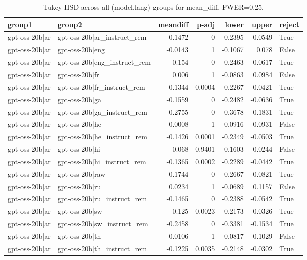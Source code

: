 \begin{table}
\caption{Tukey HSD across all (model,lang) groups for mean_diff, FWER=0.25.}
\label{tab:tukey_all_models_all_langs_mean_diff}
\begin{tabular}{l l r r r r l}
\toprule
group1 & group2 & meandiff & p-adj & lower & upper & reject \\
\midrule
gpt-oss-20b|ar & gpt-oss-20b|ar_instruct_rem & -0.1472 & 0 & -0.2395 & -0.0549 & True \\
gpt-oss-20b|ar & gpt-oss-20b|eng & -0.0143 & 1 & -0.1067 & 0.078 & False \\
gpt-oss-20b|ar & gpt-oss-20b|eng_instruct_rem & -0.154 & 0 & -0.2463 & -0.0617 & True \\
gpt-oss-20b|ar & gpt-oss-20b|fr & 0.006 & 1 & -0.0863 & 0.0984 & False \\
gpt-oss-20b|ar & gpt-oss-20b|fr_instruct_rem & -0.1344 & 0.0004 & -0.2267 & -0.0421 & True \\
gpt-oss-20b|ar & gpt-oss-20b|ga & -0.1559 & 0 & -0.2482 & -0.0636 & True \\
gpt-oss-20b|ar & gpt-oss-20b|ga_instruct_rem & -0.2755 & 0 & -0.3678 & -0.1831 & True \\
gpt-oss-20b|ar & gpt-oss-20b|he & 0.0008 & 1 & -0.0916 & 0.0931 & False \\
gpt-oss-20b|ar & gpt-oss-20b|he_instruct_rem & -0.1426 & 0.0001 & -0.2349 & -0.0503 & True \\
gpt-oss-20b|ar & gpt-oss-20b|hi & -0.068 & 0.9401 & -0.1603 & 0.0244 & False \\
gpt-oss-20b|ar & gpt-oss-20b|hi_instruct_rem & -0.1365 & 0.0002 & -0.2289 & -0.0442 & True \\
gpt-oss-20b|ar & gpt-oss-20b|raw & -0.1744 & 0 & -0.2667 & -0.0821 & True \\
gpt-oss-20b|ar & gpt-oss-20b|ru & 0.0234 & 1 & -0.0689 & 0.1157 & False \\
gpt-oss-20b|ar & gpt-oss-20b|ru_instruct_rem & -0.1465 & 0 & -0.2388 & -0.0542 & True \\
gpt-oss-20b|ar & gpt-oss-20b|sw & -0.125 & 0.0023 & -0.2173 & -0.0326 & True \\
gpt-oss-20b|ar & gpt-oss-20b|sw_instruct_rem & -0.2458 & 0 & -0.3381 & -0.1534 & True \\
gpt-oss-20b|ar & gpt-oss-20b|th & 0.0106 & 1 & -0.0817 & 0.1029 & False \\
gpt-oss-20b|ar & gpt-oss-20b|th_instruct_rem & -0.1225 & 0.0035 & -0.2148 & -0.0302 & True \\

\end{tabular}
\end{table}
